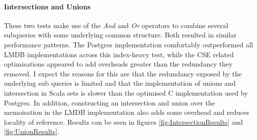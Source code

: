 \documentclass[12pt,a4paper,twoside,openright]{report}
\newcommand\mathName[1]{\textit{#1}}
\begin{document}
		\paragraph{Intersections and Unions}
	These two tests make use of the \mathName{And} and  \mathName{Or} operators to combine several subqueries with some underlying common structure. Both resulted in similar performance patterns. The Postgres implementation comfortably outperformed all LMDB implementations across this index-heavy test, while the CSE related optimisations appeared to add overheads greater than the redundancy they removed. I expect the reasons for this are that the redundancy exposed by the underlying sub queries is limited and that the implementation of unions and intersection in Scala sets is slower than the optimised C implementation used by Postgres. In addition, constructing an intersection and union over the memoisation in the LMDB implementation also adds some overhead and reduces locality of reference.	Results can be seen in figures \ref{fig:IntersectionResults} and \ref{fig:UnionResults}.
\end{document}
